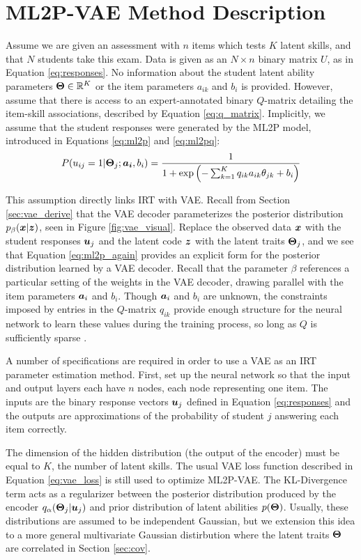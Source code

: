 \section{ML2P-VAE Method Description}\label{sec:ml2p_vae}
Assume we are given an assessment with $n$ items which tests $K$ latent skills, and that $N$ students take this exam. Data is given as an $N \times n$ binary matrix $U$, as in Equation \ref{eq:responses}. No information about the student latent ability parameters $\boldsymbol{\Theta} \in \mathbb{R}^K$ or the item parameters $a_{ik}$ and $b_i$ is provided. However, assume that there is access to an expert-annotated binary $Q$-matrix detailing the item-skill associations, described by Equation \ref{eq:q_matrix}. Implicitly, we assume that the student responses were generated by the ML2P model, introduced in Equations \ref{eq:ml2p} and \ref{eq:ml2pq}:
\begin{equation}
  P(u_{ij} = 1 | \boldsymbol{\Theta}_j; \boldsymbol{a_i}, b_i) = \frac{1}{1 + \exp\left(-\sum_{k=1}^K q_{ik} a_{ik} \theta_{jk} + b_i \right)}
  \label{eq:ml2p_again}
\end{equation}

This assumption directly links IRT with VAE. Recall from Section \ref{sec:vae_derive} that the VAE decoder parameterizes the posterior distribution $p_\beta(\boldsymbol{x} | \boldsymbol{z})$, seen in Figure \ref{fig:vae_visual}. Replace the observed data $\boldsymbol{x}$ with the student responses $\boldsymbol{u}_j$ and the latent code $\boldsymbol{z}$ with the latent traits $\boldsymbol{\Theta}_j$, and we see that Equation \ref{eq:ml2p_again} provides an explicit form for the posterior distribution learned by a VAE decoder. Recall that the parameter $\beta$ references a particular setting of the weights in the VAE decoder, drawing parallel with the item parameters $\boldsymbol{a}_i$ and $b_i$. Though $\boldsymbol{a}_i$ and $b_i$ are unknown, the constraints imposed by entries in the $Q$-matrix $q_{ik}$ provide enough structure for the neural network to learn these values during the training process, so long as $Q$ is sufficiently sparse \cite{zhehan2018}.

A number of specifications are required in order to use a VAE as an IRT parameter estimation method. First, set up the neural network so that the input and output layers each have $n$ nodes, each node representing one item. The inputs are the binary response vectors $\boldsymbol{u}_j$ defined in Equation \ref{eq:responses} and the outputs are approximations of the probability of student $j$ answering each item correctly. 

The dimension of the hidden distribution (the output of the encoder) must be equal to $K$, the number of latent skills. The usual VAE loss function described in Equation \ref{eq:vae_loss} is still used to optimize ML2P-VAE. The KL-Divergence term acts as a regularizer between the posterior distribution produced by the encoder $q_\alpha(\boldsymbol{\Theta}_j | \boldsymbol{u}_j)$ and prior distribution of latent abilities $p(\boldsymbol{\Theta})$. Usually, these distributions are assumed to be independent Gaussian, but we extension this idea to a more general multivariate Gaussian distirbution where the latent traits $\boldsymbol{\Theta}$ are correlated in Section \ref{sec:cov}.

